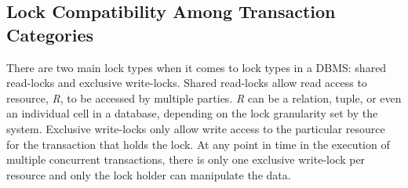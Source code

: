 \documentclass[conference]{IEEEtran}
\begin{document}



\subsection{Lock Compatibility Among Transaction Categories}
There are two main lock types when it comes to lock types in a DBMS: shared read-locks and exclusive write-locks. Shared read-locks allow read access to resource, \textit{R}, to be accessed by multiple parties. \textit{R} can be a relation, tuple, or even an individual cell in a database, depending on the lock granularity set by the system. Exclusive write-locks only allow write access to the particular resource for the transaction that holds the lock. At any point in time in the execution of multiple concurrent transactions, there is only one exclusive write-lock per resource and only the lock holder can manipulate the data.
\end{document}
